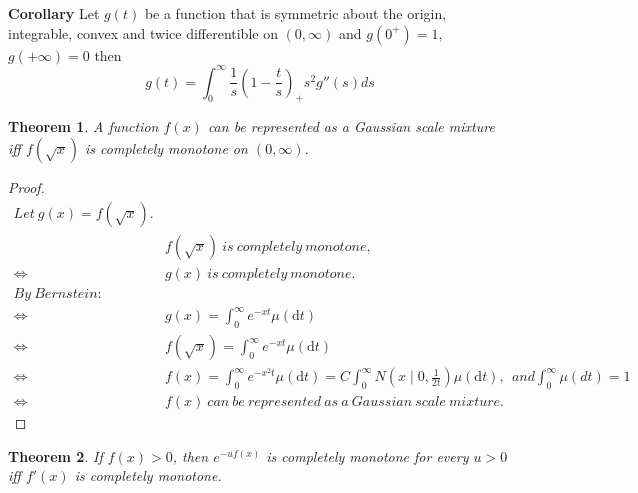 \documentclass[11pt]{article}
\newtheorem{theorem}{Theorem}[section]
\begin{document}
\textbf{Corollary}
Let $g(t)$ be a function that is symmetric about the origin, integrable, convex and twice differentible on $(0, \infty)$ and $g(0^+) = 1$, $g(+\infty) = 0$ then
\[ g(t) = \int_0^{\infty} \frac{1}{s} (1-\frac{t}{s})_+ s^2 g''(s) ds \]

\begin{theorem}
A function $f(x)$ can be represented as a Gaussian scale mixture iff $f(\sqrt{x})$ is completely monotone on $(0, \infty)$.
\end{theorem}

\begin{proof}
\[\begin{split}
Let~g(x) = f(\sqrt{x}).\\ 
& f(\sqrt{x})~is~completely~monotone,\\ 
\Longleftrightarrow & g(x)~is~completely~monotone.\\
By~Bernstein:\\
\Longleftrightarrow & g(x) = \int_{0}^{\infty}e^{-xt}\mu(\mathrm{d}t)\\
\Longleftrightarrow & f(\sqrt{x}) = \int_{0}^{\infty}e^{-xt}\mu(\mathrm{d}t)\\
\Longleftrightarrow & f(x) = \int_{0}^{\infty}e^{-x^2t}\mu(\mathrm{d}t) = C\int_{0}^{\infty}N(x\mid0, \frac{1}{2t})\mu(\mathrm{d}t),
~~and
\int_{0}^{\infty}\mu(dt) = 1\\
\Longleftrightarrow & f(x)~can~be~represented~as~a~Gaussian~scale~mixture.
\end{split}\]
\end{proof}

\begin{theorem}
If $f(x) > 0$, then $e^{-uf(x)}$ is completely monotone for every $u>0$ iff $f'(x)$ is completely monotone.
\end{theorem}
\end{document}
